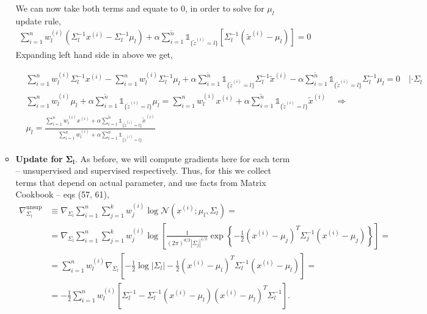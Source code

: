 \documentclass{article}
\begin{document}
\begin{enumerate}[label=(\alph*)]
\begin{itemize}
We can now take both terms and equate to 0, in order to solve for $\mu_l$ update rule,
\begin{align*}
     \sum_{i=1}^{n}w_l^{(i)}(\Sigma_l^{-1}x^{(i)} - \Sigma_l^{-1}\mu_l) +  \alpha \sum_{i=1}^{\tilde{n}}\mathds{1}_{\{\tilde{z}^{(i)}=l\}} \left[\Sigma_l^{-1}(\tilde{x}^{(i)} - \mu_l)\right] = 0
\end{align*}
Expanding left hand side in above we get,


\begin{align*}
    &\sum_{i=1}^{n}w_l^{(i)}\Sigma_l^{-1}x^{(i)} -  \sum_{i=1}^{n}w_l^{(i)}\Sigma_l^{-1}\mu_l + \alpha\sum_{i=1}^{\tilde{n}}\mathds{1}_{\{\tilde{z}^{(i)}=l\}}\Sigma_l^{-1}\tilde{x}^{(i)} - \alpha\sum_{i=1}^{\tilde{n}}\mathds{1}_{\{\tilde{z}^{(i)}=l\}}\Sigma_l^{-1}\mu_l = 0\quad|\cdot \Sigma_l \\[10pt]
&\sum_{i=1}^{n}w_l^{(i)}\mu_l +  \alpha\sum_{i=1}^{\tilde{n}}\mathds{1}_{\{\tilde{z}^{(i)}=l\}}\mu_l =  \sum_{i=1}^{n}w_l^{(i)}x^{(i)} + \alpha\sum_{i=1}^{\tilde{n}}\mathds{1}_{\{\tilde{z}^{(i)}=l\}}\tilde{x}^{(i)}\quad\Rightarrow\\[10pt]
& \boxed{\mu_l = \frac{\sum\limits_{i=1}^{n}w_l^{(i)}x^{(i)} + \alpha\sum\limits_{i=1}^{\tilde{n}}\mathds{1}_{\{\tilde{z}^{(i)}=l\}}\tilde{x}^{(i)}}{\sum\limits_{i=1}^{n}w_l^{(i)} + \alpha\sum\limits_{i=1}^{\tilde{n}} \mathds{1}_{\{\tilde{z}^{(i)}=l\}}}}
\end{align*}

\item \textbf{Update for} $\boldsymbol{\Sigma_l}.$ As before, we will compute gradients here for each term -- unsupervised and supervised respectively. Thus, for this we collect terms that depend on actual parameter, and use facts from Matrix Cookbook -- eqs (57, 61),
\begin{align*}
    \nabla_{\Sigma_l}^\text{unsup} &\equiv \nabla_{\Sigma_l} \sum\limits_{i=1}^{n}\sum\limits_{j=1}^{k}w_j^{(i)}\log\mathcal{N}(x^{(i)};\mu_l,\Sigma_l) = \\[10pt]
   & =\nabla_{\Sigma_l} \sum\limits_{i=1}^{n}\sum\limits_{j=1}^{k}w_j^{(i)}\log\left[\frac{1}{(2\pi)^{d/2}|\Sigma_j|^{1/2}}\exp\left\{-\frac{1}{2}(x^{(i)} - \mu_j)^T\Sigma_j^{-1}(x^{(i)} - \mu_j)\right\}\right]=\\[10pt]
   & = \sum\limits_{i=1}^{n} w_l^{(i)} \nabla_{\Sigma_l}\left[-\frac{1}{2}\log|\Sigma_l| - \frac{1}{2}(x^{(i)} - \mu_l)^T\Sigma_l^{-1}(x^{(i)} - \mu_l)\right] = \\[10pt]
   &= -\frac{1}{2}\sum\limits_{i=1}^{n} w_l^{(i)}\left[\Sigma_l^{-1} - \Sigma^{-1}_l(x^{(i)} - \mu_l)(x^{(i)} - \mu_l)^T\Sigma^{-1}_l\right].
\end{align*}


\end{itemize}
\end{enumerate}
\end{document}
